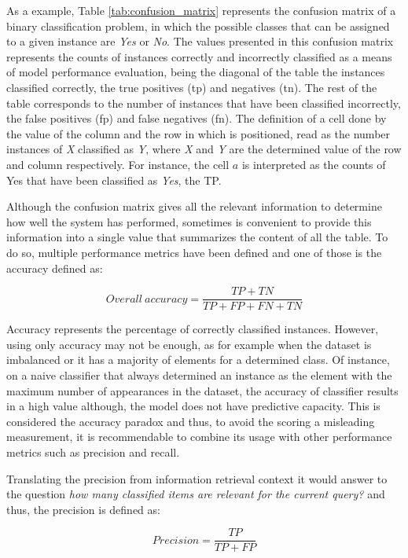 As a example, Table \ref{tab:confusion_matrix} represents the confusion matrix of a binary classification problem, in which the possible classes that can be assigned to a given instance are \textit{Yes} or \textit{No}. The values presented in this confusion matrix represents the counts of instances correctly and incorrectly classified as a means of model performance evaluation, being the diagonal of the table the instances classified correctly, the true positives (\acrshort{tp}) and negatives (\acrshort{tn}). The rest of the table corresponds to the number of instances that have been classified incorrectly, the false positives (\acrshort{fp}) and false negatives (\acrshort{fn}). The definition of a cell done by the value of the column and the row in which is positioned, read as the number instances of \textit{X} classified as \textit{Y}, where \textit{X} and \textit{Y} are the determined value of the row and column respectively. For instance, the cell $a$ is interpreted as the counts of Yes that have been classified as \textit{Yes}, the TP.

Although the confusion matrix gives all the relevant information to determine how well the system has performed, sometimes is convenient to provide this information into a single value that summarizes the content of all the table. To do so, multiple performance metrics have been defined and one of those is the accuracy defined as:

\[Overall\ accuracy=\frac{TP+TN}{TP+FP+FN+TN}\]

Accuracy represents the percentage of correctly classified instances. However, using only accuracy may not be enough, as for example when the dataset is imbalanced or it has a majority of elements for a determined class. Of instance, on a naive classifier that always determined an instance as the element with the maximum number of appearances in the dataset, the accuracy of classifier results in a high value although, the model does not have predictive capacity. This is considered the accuracy paradox \cite{accuracyParadox} and thus, to avoid the scoring a misleading measurement, it is recommendable to combine its usage with other performance metrics such as precision and recall.

Translating the precision from information retrieval context it would answer to the question \textit{how many classified items are relevant for the current query?} and thus, the precision is defined as:

\[Precision=\frac{TP}{TP+FP}\]

